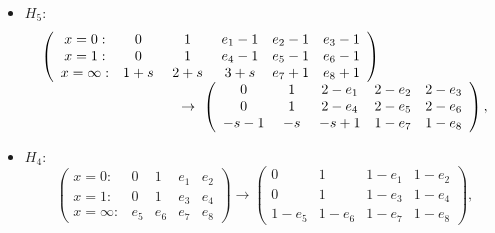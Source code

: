 \documentclass[a4paper,12pt]{article}
\theoremstyle{definition}
\theoremstyle{remark}
\numberwithin{equation}{section} %
\def\comment#1{ }
\begin{document}
\begin{itemize}
\item  $H_5$:
$$ 
  \begin{array}{l}
    \left(\begin{array}{cccccc}
x=0:&0&1&e_1-1&e_2-1&e_3-1\\
x=1:&0&1&e_4-1&e_5-1&e_6-1\\
x=\infty:&1+s&\ 2+s\ &3+s&e_7+1&e_8+1\end{array}\right)
\\
\hskip100pt
\to\ \left(\begin{array}{cccccc}
0&1&2-e_1&2-e_2&2-e_3\\
0&1&2-e_4&2-e_5&2-e_6\\
-s-1&\ -s\ &-s+1&1-e_7&1-e_8\end{array}\right),\end{array}$$
\comment{
\item  $S\!E_5$:
  $$S\!E_5^*(a,b,c,g,p,q)=S\!E_5( -a - 1, -b - 1, -c - 1, -g, -p - 1, -q - 1).$$
}
\item $H_4$:
\[\left(\begin{array}{ccccc}
x=0:&0&1&e_1&e_2\\
x=1:&0&1&e_3&e_4\\
x=\infty:&e_5&e_6&e_7&e_8\end{array}\right)\to
\left(\begin{array}{cccc}
0&1&1-e_1&1-e_2\\
0&1&1-e_3&1-e_4\\
1-e_5&1-e_6&1-e_7&1-e_8\end{array}\right),
\]
\comment{ $S\!E_4$:
$$S\!E_4^*(a,b,c,g,q)=S\!E_4(-a-1,-b-1,-c-1,-g,-q-1.)$$
 $Z_4$:
$$ Z_4^*(A,\!k)=Z_4(A,-k).$$
 ${\rm ST}_4$:
\[\left(\begin{array}{ccccc}
x=0:&0&1&e_1&e_2\\
x=1:&0&1&e_3&e_4\\
x=\infty:&s&s+1&e_5&e_6\end{array}\right)\to
\left(\begin{array}{cccc}
0&1&1-e_1&1-e_2\\
0&1&1-e_3&1-e_4\\
-s&1-s&1-e_5&1-e_6\end{array}\right),
\]
}
\end{itemize}
\end{document}
